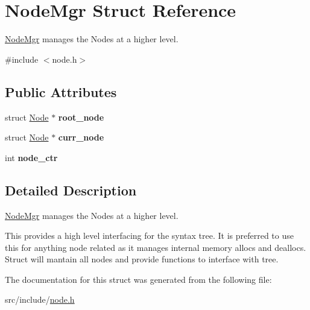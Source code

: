 \hypertarget{struct_node_mgr}{}\section{Node\+Mgr Struct Reference}
\label{struct_node_mgr}


\mbox{\hyperlink{struct_node_mgr}{Node\+Mgr}} manages the Nodes at a higher level.  




{\ttfamily \#include $<$node.\+h$>$}

\subsection*{Public Attributes}
\begin{DoxyCompactItemize}
\item 
\mbox{\label{struct_node_mgr_aecbb86b92ff4137af50a52c88eea4684}} 
struct \mbox{\hyperlink{struct_node}{Node}} $\ast$ {\bfseries root\+\_\+node}
\item 
\mbox{\label{struct_node_mgr_ad9688343fdd90a0c3d55e00f37764862}} 
struct \mbox{\hyperlink{struct_node}{Node}} $\ast$ {\bfseries curr\+\_\+node}
\item 
\mbox{\label{struct_node_mgr_a7c07158a8dcef7307da3ca3b51439cb5}} 
int {\bfseries node\+\_\+ctr}
\end{DoxyCompactItemize}


\subsection{Detailed Description}
\mbox{\hyperlink{struct_node_mgr}{Node\+Mgr}} manages the Nodes at a higher level. 

This provides a high level interfacing for the syntax tree. It is preferred to use this for anything node related as it manages internal memory allocs and deallocs. Struct will mantain all nodes and provide functions to interface with tree. 

The documentation for this struct was generated from the following file\+:\begin{DoxyCompactItemize}
\item 
src/include/\mbox{\hyperlink{node_8h}{node.\+h}}\end{DoxyCompactItemize}
